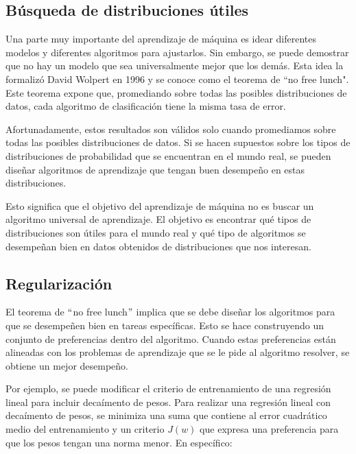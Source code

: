 \subsection{Búsqueda de distribuciones útiles}
Una parte muy importante del aprendizaje de máquina es idear diferentes modelos y diferentes algoritmos para ajustarlos. Sin embargo, se puede demostrar que no hay un modelo que sea universalmente mejor que los demás. Esta idea la formalizó David Wolpert en 1996 y se conoce como el teorema de ``no free lunch". Este teorema expone que, promediando sobre todas las posibles distribuciones de datos, cada algoritmo de clasificación tiene la misma tasa de error. 
\cite{Murphy:2012:MLP:2380985}
\cite{wolpert}

\vspace{1em}

Afortunadamente, estos resultados son válidos solo cuando promediamos sobre todas las posibles distribuciones de datos. Si se hacen supuestos sobre los tipos de distribuciones de probabilidad que se encuentran en el mundo real, se pueden diseñar algoritmos de aprendizaje que tengan buen desempeño en estas distribuciones.

\vspace{1em}

Esto significa que el objetivo del aprendizaje de máquina no es buscar un algoritmo universal de aprendizaje. El objetivo es encontrar qué tipos de distribuciones son útiles para el mundo real y qué tipo de algoritmos se desempeñan bien en datos obtenidos de distribuciones que nos interesan.
\cite{goodfellow-et-al-2016}

\subsection{Regularización}
El teorema de $``$no free lunch$"$ implica que se debe diseñar los algoritmos para que se desempeñen bien en tareas específicas. Esto se hace construyendo un conjunto de preferencias dentro del algoritmo. Cuando estas preferencias están alineadas con los problemas de aprendizaje que se le pide al algoritmo resolver, se obtiene un mejor desempeño.
\cite{goodfellow-et-al-2016}

\vspace{1em}

Por ejemplo, se puede modificar el criterio de entrenamiento de una regresión lineal para incluir decaímento de pesos. Para realizar una regresión lineal con decaímento de pesos, se minimiza una suma que contiene al error cuadrático medio del entrenamiento y un criterio $J(w)$ que expresa una preferencia para que los pesos tengan una norma menor. En específico: 

